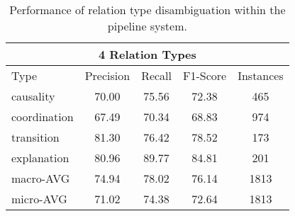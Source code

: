 \begin{table}[ht]
\centering
\begin{tabular}{|l|c|c|c|c|}
\hline

\multicolumn{5}{|c|}{4 Relation Types}                                          \\ \hline
Type                &     Precision &     Recall &     F1-Score &     Instances \\ \hline
causality           &     70.00     &     75.56  &     72.38    &     465       \\ \hline
coordination        &     67.49     &     70.34  &     68.83    &     974       \\ \hline
transition          &     81.30     &     76.42  &     78.52    &     173       \\ \hline
explanation         &     80.96     &     89.77  &     84.81    &     201       \\ \hline
macro-AVG           &     74.94     &     78.02  &     76.14    &     1813      \\ \hline
micro-AVG           &     71.02     &     74.38  &     72.64    &     1813      \\ \hline

\end{tabular}
\caption{\label{t:sense-types-pipeline} Performance of relation type
disambiguation within the pipeline system. }
\end{table}
